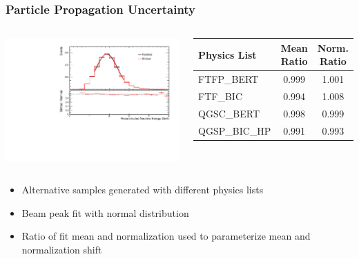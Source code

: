\documentclass[10pt,professionalfonts,xcolor=table]{beamer}
\begin{document}
\begin{frame}
\begin{columns}[b]
\end{columns}

\end{frame}

\begin{frame}
\frametitle{Particle Propagation Uncertainty}

\begin{columns}[c]


\includegraphics[angle=-90, width=1\textwidth]{figures/systs/params/nd_QGSP_BIC_HP.pdf}


\begin{center}
\small
\begin{tabular}{|l|c|c|}
\hline
Physics List & Mean Ratio & Norm. Ratio \\ \hline
FTFP\_BERT  &  0.999 & 1.001\\ \hline
FTF\_BIC &  0.994 & 1.008  \\ \hline
QGSC\_BERT  &  0.998 & 0.999\\ \hline
QGSP\_BIC\_HP  &  0.991 & 0.993\\ \hline
\end{tabular}
\end{center}




\end{columns}

\begin{itemize}
\item Alternative samples generated with different physics lists
\item Beam peak fit with normal distribution
\item Ratio of fit mean and normalization used to parameterize mean and normalization shift
\end{itemize}



\end{frame}
\end{document}

